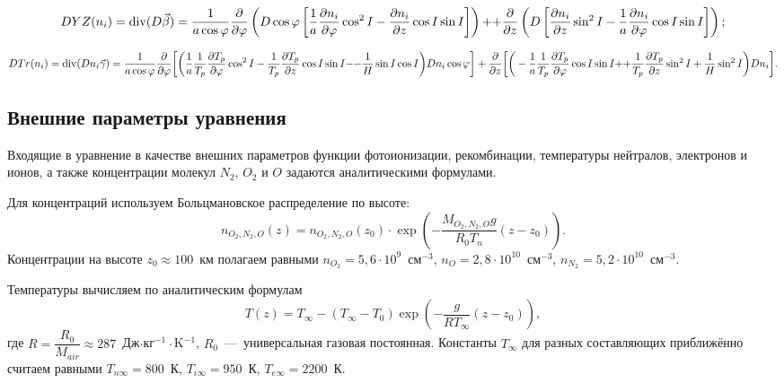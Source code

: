 \documentclass[14pt, a4paper]{extarticle}
\renewcommand{\div}{\operatorname{div}}
\begin{document}
\begin{equation}\label{DYZ} DYZ(n_i) = \div (D\vec{\beta}) = \dfrac{1}{a\cos\varphi}\dfrac{\partial}{\partial\varphi}\left(D\cos\varphi\left[\dfrac{1}{a}\dfrac{\partial n_i}{\partial\varphi} \cos^2 I -\dfrac{\partial n_i}{\partial z}\cos I\sin I\right]\right)+$$ $$ + \dfrac{\partial}{\partial z}\left(D\left[\dfrac{\partial n_i}{\partial z}\sin^2 I - \dfrac{1}{a}\dfrac{\partial n_i}{\partial\varphi}\cos I \sin I\right]\right);\end{equation}

\begin{equation}\label{DTr} DTr(n_i) = \div(Dn_i\vec{\gamma}) = \dfrac{1}{a\cos\varphi}\dfrac{\partial}{\partial \varphi}\bigg[\bigg(\dfrac{1}{a}\dfrac{1}{T_p}\dfrac{\partial T_p}{\partial\varphi}\cos^2 I-\dfrac{1}{T_p}\dfrac{\partial T_p}{\partial z}\cos I \sin I - $$ $$-\dfrac{1}{H}\sin I \cos I\bigg)Dn_i\cos\varphi\bigg] + \dfrac{\partial}{\partial z}\bigg[\bigg(-\dfrac{1}{a}\dfrac{1}{T_p}\dfrac{\partial T_p}{\partial \varphi}\cos I \sin I +$$ $$ +\dfrac{1}{T_p}\dfrac{\partial T_p}{\partial z}\sin^2 I+\dfrac{1}{H}\sin^2I\bigg)Dn_i\bigg].\end{equation}











\subsection{Внешние параметры уравнения}

Входящие в уравнение в качестве внешних параметров функции фотоионизации, рекомбинации, температуры нейтралов, электронов и ионов, а также концентрации молекул $N_2$, $O_2$ и $O$ задаются аналитическими формулами. 

Для концентраций используем Больцмановское распределение по высоте: \begin{equation} n_{O_2, N_2, O} (z)= n_{O_2, N_2, O} (z_0)\cdot \exp\left(-\dfrac{M_{O_2, N_2, O}g}{R_0T_n}(z-z_0)\right).\end{equation} Концентрации на высоте $z_0\approx 100$~км полагаем равными $n_{O_2} = 5{,}6\cdot 10^9$~см$^{-3}$, $n_{O} = 2{,}8\cdot 10^{10}$~см$^{-3}$, $n_{N_2} = 5{,}2\cdot 10^{10}$~см$^{-3}$. 

Температуры вычисляем по аналитическим формулам \begin{equation}T(z)=T_\infty - (T_\infty-T_0)\exp\left(-\dfrac{g}{RT_\infty}(z-z_0)\right),\end{equation} где $R=\dfrac{R_0}{M_{air}}\approx 287$~Дж$\cdot$кг$^{-1}\cdot$K$^{-1}$, $R_0$~---~универсальная газовая постоянная. Константы $T_\infty$ для разных составляющих приближённо считаем равными $T_{n\infty}=800$~К, $T_{i\infty}=950$~К, $T_{e\infty}=2200$~К.
\end{document}
